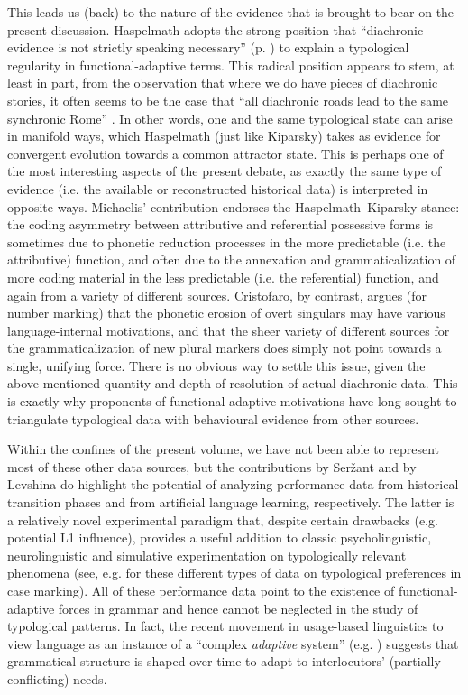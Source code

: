\documentclass[output=paper]{langsci/langscibook}
\begin{document}
This leads us (back) to the nature of the evidence that is brought to bear on the present discussion. Haspelmath adopts the strong position that “diachronic evidence is not strictly speaking necessary” (p. \pageref{p:haspelmath:strictlyspeakingnecessary}) to explain a typological regularity in functional-adaptive terms. This radical position appears to stem, at least in part, from the observation that where we do have pieces of diachronic stories, it often seems to be the case that “all diachronic roads lead to the same synchronic Rome” \citep[38]{Kiparsky2008}. In other words, one and the same typological state can arise in manifold ways, which Haspelmath (just like Kiparsky) takes as evidence for convergent evolution towards a common attractor state. This is perhaps one of the most interesting aspects of the present debate, as exactly the same type of evidence (i.e. the available or reconstructed historical data) is interpreted in opposite ways. Michaelis’ contribution endorses the Haspelmath–Kiparsky stance: the coding asymmetry between attributive and referential possessive forms is sometimes due to phonetic reduction processes in the more predictable (i.e. the attributive) function, and often due to the annexation and grammaticalization of more coding material in the less predictable (i.e. the referential) function, and again from a variety of different sources. Cristofaro, by contrast, argues (for number marking) that the phonetic erosion of overt singulars may have various language-internal motivations, and that the sheer variety of different sources for the grammaticalization of new plural markers does simply not point towards a single, unifying force. There is no obvious way to settle this issue, given the above-mentioned quantity and depth of resolution of actual diachronic data. This is exactly why proponents of functional-adaptive motivations have long sought to triangulate typological data with behavioural evidence from other sources.

Within the confines of the present volume, we have not been able to represent most of these other data sources, but the contributions by Seržant and by Levshina do highlight the potential of analyzing performance data from historical transition phases and from artificial language learning, respectively. The latter is a relatively novel experimental paradigm that, despite certain drawbacks (e.g. potential L1 influence), provides a useful addition to classic psycholinguistic, neurolinguistic and simulative experimentation on typologically relevant phenomena (see, e.g. \citealt{KurumadaJaeger2015,BickelEtAl2015,Lestrade2018} for these different types of data on typological preferences in case marking). All of these performance data point to the existence of functional-adaptive forces in grammar and hence cannot be neglected in the study of typological patterns. In fact, the recent movement in usage-based linguistics to view language as an instance of a “complex \textit{adaptive} system” (e.g. \citealt{Gell-Mann1992,BecknerEtAl2009}) suggests that grammatical structure is shaped over time to adapt to interlocutors’ (partially conflicting) needs. 
\end{document}
